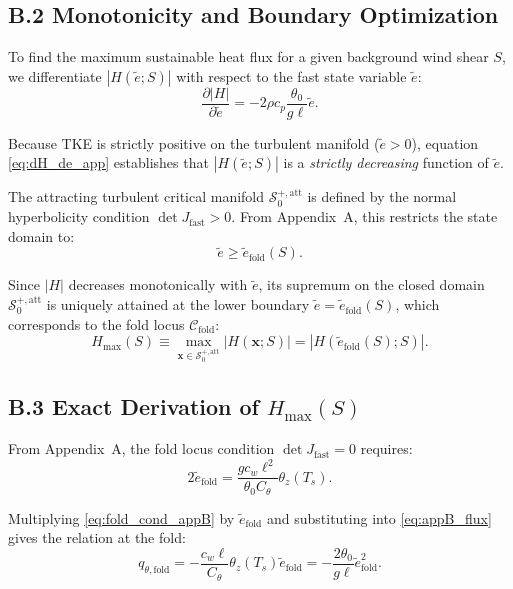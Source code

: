 \subsection*{B.2 Monotonicity and Boundary Optimization}

To find the maximum sustainable heat flux for a given background wind shear $S$, we differentiate $|H(\tilde e; S)|$ with respect to the fast state variable $\tilde e$:
\begin{equation}
\frac{\partial |H|}{\partial \tilde e} = -2 \rho c_p \frac{\theta_0}{g \ell} \tilde e.
\label{eq:dH_de_app}
\end{equation}

Because TKE is strictly positive on the turbulent manifold ($\tilde e > 0$), equation \eqref{eq:dH_de_app} establishes that $|H(\tilde e; S)|$ is a \emph{strictly decreasing} function of $\tilde e$. 

The attracting turbulent critical manifold $\mathcal{S}_0^{+,\mathrm{att}}$ is defined by the normal hyperbolicity condition $\det J_{\mathrm{fast}} > 0$. From Appendix~A, this restricts the state domain to:
\begin{equation}
\tilde e \ge \tilde e_{\mathrm{fold}}(S).
\end{equation}

Since $|H|$ decreases monotonically with $\tilde e$, its supremum on the closed domain $\mathcal{S}_0^{+,\mathrm{att}}$ is uniquely attained at the lower boundary $\tilde e = \tilde e_{\mathrm{fold}}(S)$, which corresponds to the fold locus $\mathcal{C}_{\mathrm{fold}}$:
\begin{equation}
H_{\max}(S) \equiv \max_{\mathbf{x} \in \mathcal{S}_0^{+,\mathrm{att}}} |H(\mathbf{x}; S)| = |H(\tilde e_{\mathrm{fold}}(S); S)|.
\label{eq:Hmax_boundary_cond}
\end{equation}

\subsection*{B.3 Exact Derivation of $H_{\max}(S)$}

From Appendix~A, the fold locus condition $\det J_{\mathrm{fast}} = 0$ requires:
\begin{equation}
2\tilde e_{\mathrm{fold}} = \frac{g c_w \ell^2}{\theta_0 C_\theta} \theta_z(T_s).
\label{eq:fold_cond_appB}
\end{equation}

Multiplying \eqref{eq:fold_cond_appB} by $\tilde e_{\mathrm{fold}}$ and substituting into \eqref{eq:appB_flux} gives the relation at the fold:
\begin{equation}
q_{\theta,\mathrm{fold}} = -\frac{c_w \ell}{C_\theta} \theta_z(T_s) \tilde e_{\mathrm{fold}} = -\frac{2 \theta_0}{g \ell} \tilde e_{\mathrm{fold}}^2.
\label{eq:q_fold_rel}
\end{equation}

